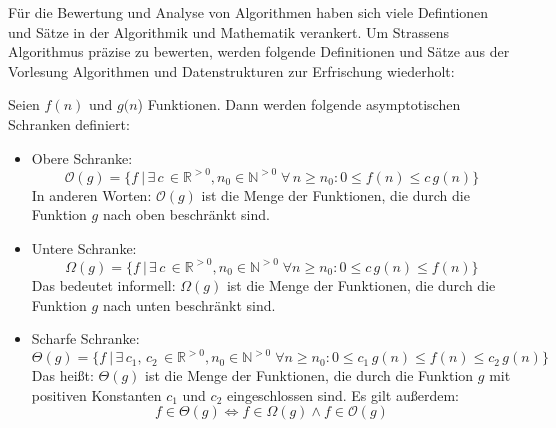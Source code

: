 Für die Bewertung und Analyse von Algorithmen haben sich viele Defintionen und Sätze in der Algorithmik und Mathematik verankert.
Um Strassens Algorithmus präzise zu bewerten, werden folgende Definitionen und Sätze aus der Vorlesung Algorithmen und Datenstrukturen zur Erfrischung wiederholt:
\begin{env_definition}
    Seien $f(n)$ und $g(n$) Funktionen.
    Dann werden folgende asymptotischen Schranken definiert:
    \begin{itemize}
        \item Obere Schranke:
        \[
            \mathcal{O}(g) = \{f\ |\,\exists\,c\,\in \mathbb{R}^{> 0}, n_0 \in \mathbb{N}^{> 0}\; \forall \,n \geq n_0: 0 \leq f(n) \leq c\,g(n)\}
        \]
        In anderen Worten: $\mathcal{O}(g)$ ist die Menge der Funktionen, die durch die Funktion $g$ nach oben beschränkt sind.
        \item Untere Schranke:
        \[
            \Omega(g) = \{f\ |\, \exists\,c\,\in \mathbb{R}^{> 0}, n_0 \in \mathbb{N}^{> 0}\; \forall n \geq n_0: 0 \leq c\,g(n) \leq f(n) \}
        \]
        Das bedeutet informell: $\Omega(g)$ ist die Menge der Funktionen, die durch die Funktion $g$ nach unten beschränkt sind.
        \item Scharfe Schranke:
        \[
            \Theta(g) = \{f\ |\, \exists\,c_1,\,c_2\,\in \mathbb{R}^{> 0}, n_0 \in \mathbb{N}^{> 0}\; \forall n \geq n_0: 0 \leq c_1\,g(n) \leq f(n) \leq c_2\,g(n)\}
        \]
        Das heißt: $\Theta(g)$ ist die Menge der Funktionen, die durch die Funktion $g$ mit positiven Konstanten $c_1$ und $c_2$ eingeschlossen sind.
        Es gilt außerdem:
        \[
            f \in \Theta(g) \iff f \in \Omega(g) \land f \in \mathcal{O}(g)
        \]
    \end{itemize}
\end{env_definition}

